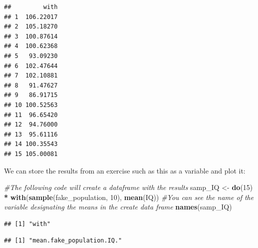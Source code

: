 \documentclass[]{book}
\newenvironment{Shaded}{\begin{snugshade}}{\end{snugshade}}
\newcommand{\CommentTok}[1]{\textcolor[rgb]{0.56,0.35,0.01}{\textit{#1}}}
\newcommand{\DecValTok}[1]{\textcolor[rgb]{0.00,0.00,0.81}{#1}}
\newcommand{\KeywordTok}[1]{\textcolor[rgb]{0.13,0.29,0.53}{\textbf{#1}}}
\newcommand{\NormalTok}[1]{#1}
\newcommand{\OperatorTok}[1]{\textcolor[rgb]{0.81,0.36,0.00}{\textbf{#1}}}
\newcommand{\StringTok}[1]{\textcolor[rgb]{0.31,0.60,0.02}{#1}}
\theoremstyle{definition}
\theoremstyle{definition}
\theoremstyle{definition}
\theoremstyle{remark}
\begin{document}
\begin{verbatim}
##         with
## 1  106.22017
## 2  105.18270
## 3  100.87614
## 4  100.62368
## 5   93.09230
## 6  102.47644
## 7  102.10881
## 8   91.47627
## 9   86.91715
## 10 100.52563
## 11  96.65420
## 12  94.76000
## 13  95.61116
## 14 100.35543
## 15 105.00081
\end{verbatim}

We can store the results from an exercise such as this as a variable and
plot it:

\begin{Shaded}
\begin{Highlighting}[]
\CommentTok{#The following code will create a dataframe with the results}
\NormalTok{samp_IQ <-}\StringTok{ }\KeywordTok{do}\NormalTok{(}\DecValTok{15}\NormalTok{) }\OperatorTok{*}\StringTok{ }\KeywordTok{with}\NormalTok{(}\KeywordTok{sample}\NormalTok{(fake_population, }\DecValTok{10}\NormalTok{), }\KeywordTok{mean}\NormalTok{(IQ))}
\CommentTok{#You can see the name of the variable designating the means in the create data frame}
\KeywordTok{names}\NormalTok{(samp_IQ)}
\end{Highlighting}
\end{Shaded}

\begin{verbatim}
## [1] "with"
\end{verbatim}

\begin{Shaded}
\end{Shaded}

\begin{verbatim}
## [1] "mean.fake_population.IQ."
\end{verbatim}
\end{document}
